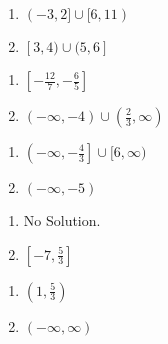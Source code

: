 \begin{multicols}{2}
\begin{enumerate}
\setcounter{enumi}{\value{HW}}

\item $(-3,2] \cup [6,11)$
\item $[3, 4) \cup (5, 6]$


\setcounter{HW}{\value{enumi}}
\end{enumerate}
\end{multicols}

\begin{multicols}{2}
\begin{enumerate}
\setcounter{enumi}{\value{HW}}


\item $\left[-\frac{12}{7}, -\frac{6}{5}\right]$
\item $(-\infty, -4) \cup \left( \frac{2}{3}, \infty\right)$


\setcounter{HW}{\value{enumi}}
\end{enumerate}
\end{multicols}

\begin{multicols}{2}
\begin{enumerate}
\setcounter{enumi}{\value{HW}}

\item $\left(-\infty, -\frac{4}{3} \right] \cup [6, \infty)$

\item   $(-\infty, -5)$

\setcounter{HW}{\value{enumi}}
\end{enumerate}
\end{multicols}

\begin{multicols}{2}
\begin{enumerate}
\setcounter{enumi}{\value{HW}}

 \item   No Solution.

\item    $\left[ -7, \frac{5}{3}\right]$

\setcounter{HW}{\value{enumi}}
\end{enumerate}
\end{multicols}

\begin{multicols}{2}
\begin{enumerate}
\setcounter{enumi}{\value{HW}}

\item  $\left( 1, \frac{5}{3} \right)$

\item   $(-\infty, \infty)$

\setcounter{HW}{\value{enumi}}
\end{enumerate}
\end{multicols}

